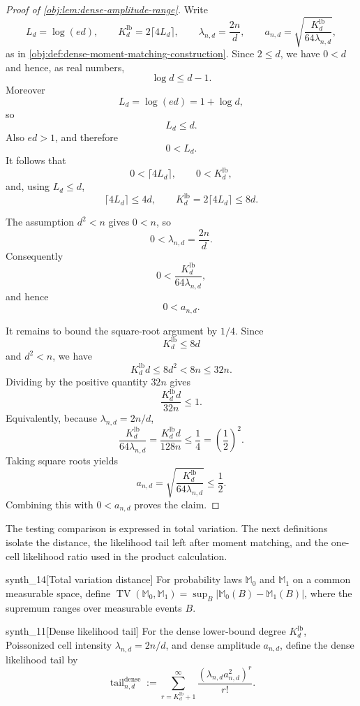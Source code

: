 \documentclass[11pt]{article}
\begin{document}
\begin{proof}[Proof of \cref{obj:lem:dense-amplitude-range}]
Write
\[
L_d=\log(ed),\qquad
K_d^{\mathrm{lb}}=2\lceil 4L_d\rceil,\qquad
\lambda_{n,d}=\frac{2n}{d},
\qquad
a_{n,d}=\sqrt{\frac{K_d^{\mathrm{lb}}}{64\lambda_{n,d}}},
\]
as in \cref{obj:def:dense-moment-matching-construction}.  Since \(2\le d\), we have \(0<d\) and hence, as real numbers,
\[
\log d\le d-1.
\]
Moreover
\[
L_d=\log(ed)=1+\log d,
\]
so
\[
L_d\le d.
\]
Also \(ed>1\), and therefore
\[
0<L_d.
\]
It follows that
\[
0<\lceil 4L_d\rceil,
\qquad
0<K_d^{\mathrm{lb}},
\]
and, using \(L_d\le d\),
\[
\lceil 4L_d\rceil\le 4d,
\qquad
K_d^{\mathrm{lb}}=2\lceil 4L_d\rceil\le 8d .
\]

The assumption \(d^2<n\) gives \(0<n\), so
\[
0<\lambda_{n,d}=\frac{2n}{d}.
\]
Consequently
\[
0<
\frac{K_d^{\mathrm{lb}}}{64\lambda_{n,d}},
\]
and hence
\[
0<a_{n,d}.
\]

It remains to bound the square-root argument by \(1/4\).  Since
\[
K_d^{\mathrm{lb}}\le 8d
\]
and \(d^2<n\), we have
\[
K_d^{\mathrm{lb}}d\le 8d^2<8n\le 32n .
\]
Dividing by the positive quantity \(32n\) gives
\[
\frac{K_d^{\mathrm{lb}}d}{32n}\le 1.
\]
Equivalently, because \(\lambda_{n,d}=2n/d\),
\[
\frac{K_d^{\mathrm{lb}}}{64\lambda_{n,d}}
=
\frac{K_d^{\mathrm{lb}}d}{128n}
\le
\frac14
=
\left(\frac12\right)^2 .
\]
Taking square roots yields
\[
a_{n,d}
=
\sqrt{\frac{K_d^{\mathrm{lb}}}{64\lambda_{n,d}}}
\le
\frac12 .
\]
Combining this with \(0<a_{n,d}\) proves the claim.
\end{proof}

The testing comparison is expressed in total variation. The next definitions isolate the distance, the likelihood tail left after moment matching, and the one-cell likelihood ratio used in the product calculation.

\begin{definitionv}{synth_14}[Total variation distance]
For probability laws \(\mathbb M_0\) and \(\mathbb M_1\) on a common measurable space, define \(\operatorname{TV}(\mathbb M_0,\mathbb M_1)=\sup_{B}\lvert \mathbb M_0(B)-\mathbb M_1(B)\rvert\), where the supremum ranges over measurable events \(B\).
\end{definitionv}

\begin{definitionv}{synth_11}[Dense likelihood tail]
For the dense lower-bound degree \(K_d^{\mathrm{lb}}\), Poissonized cell intensity \(\lambda_{n,d}=2n/d\), and dense amplitude \(a_{n,d}\), define the dense likelihood tail by \[\operatorname{tail}_{n,d}^{\mathrm{dense}}:=\sum_{r=K_d^{\mathrm{lb}}+1}^{\infty}\frac{(\lambda_{n,d}a_{n,d}^2)^r}{r!}.\]
\end{definitionv}
\end{document}
